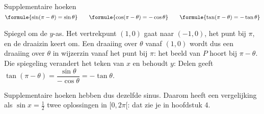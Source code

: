 \begin{theorie}
\begin{stelling}{Supplementaire hoeken}
\qquad $\formule{\sin(\pi - \theta) = \sin\theta} \qquad \formule{\cos(\pi - \theta) = -\cos\theta} \qquad \formule{\tan(\pi - \theta) = -\tan\theta}$
\end{stelling}
\begin{bewijs}
Spiegel om de $y$-as. Het vertrekpunt $(1, 0)$ gaat naar $(-1, 0)$, het punt bij $\pi$, en de draaizin keert om. Een draaiing over $\theta$ vanaf $(1, 0)$ wordt dus een draaiing over $\theta$ in wijzerzin vanaf het punt bij $\pi$: het beeld van $P$ hoort bij $\pi - \theta$. Die spiegeling verandert het teken van $x$ en behoudt $y$:
Delen geeft $\tan(\pi - \theta) = \dfrac{\sin\theta}{-\cos\theta} = -\tan\theta$.
\end{bewijs}
\end{theorie}

Supplementaire hoeken hebben dus dezelfde sinus. Daarom heeft een vergelijking als $\sin x = \frac12$ twee oplossingen in $[0, 2\pi[$: dat zie je in hoofdstuk 4.


\begin{oefeningen}
\end{oefeningen}

